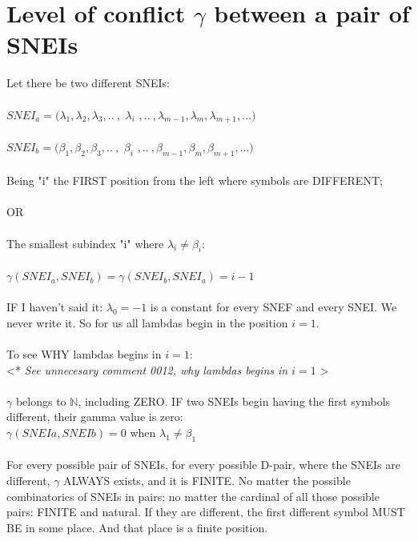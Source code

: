 \chapter{Level of conflict $\gamma$ between a pair of SNEIs}

	\noindent
	Let there be two different SNEIs:\\\\
	$SNEI_{a} = (\lambda_{1}, \lambda_{2}, \lambda_{3}, .. \:,$ \textbf{$\lambda_{i}$} $, .. \: , \lambda_{m-1}, \lambda_{m}, \lambda_{m+1}, ...)$\\\\
	$SNEI_{b} = (\beta_{1}, \beta_{2}, \beta_{3}, .. \:,$ \textbf{$\beta_{i}$} $, .. \:, \beta_{m-1},\beta_{m}, \beta_{m+1},...)$
	\\\\
	
	\noindent
	Being "i" the FIRST position from the left where symbols are DIFFERENT;\\\\
	OR\\\\
	The smallest subindex "i" where $\lambda_{i} \neq \beta_{i}$:\\\\
	$\gamma(SNEI_{a}, SNEI_{b}) = \gamma(SNEI_{b}, SNEI_{a}) = i - 1$
	\\\\
	
	\noindent
	IF I haven't said it: $\lambda_{0} = -1$ is a constant for every SNEF and every SNEI. We never write it. So for us all lambdas begin in the position $i=1$.
	\\\\
	
	\noindent
	To see WHY lambdas begins in $i=1$:\\
	\textless ** \textit{See unnecesary comment 0012, why lambdas begins in $i=1$} \textgreater
	\\\\
	
	\noindent
	$\gamma$ belongs to $\mathbb{N}$, including ZERO. IF two SNEIs begin having the first symbols different, their gamma value is zero:\\
	$ \gamma(SNEIa, SNEIb)= 0 $ when $\lambda_{1} \neq \beta_{1}$
	\\\\
	
	\noindent
	For every possible pair of SNEIs, for every possible D-pair, where the SNEIs are different, $\gamma$ ALWAYS exists, and it is FINITE. No matter the possible combinatorics of SNEIs in pairs; no matter the cardinal of all those possible pairs: FINITE and natural. If they are different, the first different symbol MUST BE in some place. And that place is a finite position.
	\\\\
	
